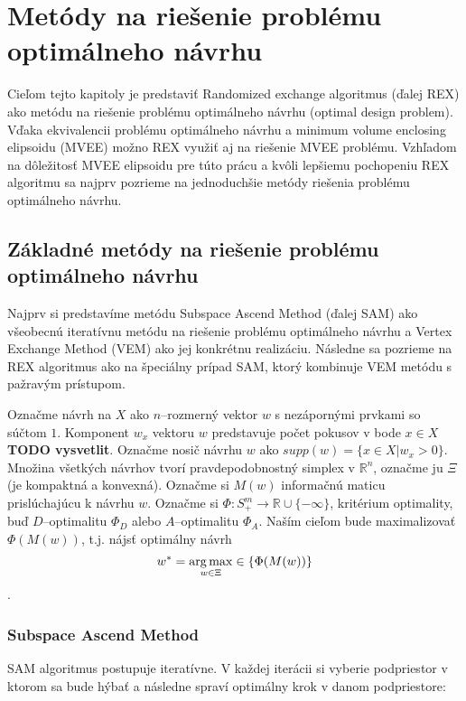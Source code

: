 \chapter{Metódy na riešenie problému optimálneho návrhu}

Cieľom tejto kapitoly je predstaviť Randomized exchange algoritmus \cite{rex_harman} (ďalej REX) ako metódu na riešenie problému optimálneho návrhu (optimal design problem). Vďaka ekvivalencii problému optimálneho návrhu a minimum volume enclosing elipsoidu (MVEE) \cite{rex_harman} možno REX využiť aj na riešenie MVEE problému.
Vzhľadom na dôležitosť MVEE elipsoidu pre túto prácu a kvôli lepšiemu pochopeniu REX algoritmu sa najprv pozrieme na jednoduchšie metódy riešenia problému optimálneho návrhu.

\section{Základné metódy na riešenie problému optimálneho návrhu}

Najprv si predstavíme metódu Subspace Ascend Method (ďalej SAM) ako všeobecnú iteratívnu metódu na riešenie problému optimálneho návrhu a Vertex Exchange Method (VEM) ako jej konkrétnu realizáciu. Následne sa pozrieme na REX algoritmus ako na špeciálny prípad SAM, ktorý kombinuje VEM metódu s pažravým prístupom.

Označme návrh na $X$ ako $n$--rozmerný vektor $w$ s nezápornými prvkami so súčtom $1$. Komponent $w_x$ vektoru $w$ predstavuje počet pokusov v bode $x \in X$ \textbf{TODO vysvetlit}. Označme nosič návrhu $w$ ako $supp(w)=\{x \in X| w_x>0\}$. Množina všetkých návrhov tvorí pravdepodobnostný simplex v $\mathbb{R}^n$, označme ju $\Xi$ (je kompaktná a konvexná). Označme si $M(w)$ informačnú maticu prislúchajúcu k návrhu $w$. Označme si $\Phi: S^m_+ \rightarrow \mathbb{R} \cup \{-\infty\}$, kritérium optimality, buď $D$--optimalitu $\Phi_D$ alebo $A$--optimalitu $\Phi_A$. Naším cieľom bude maximalizovať $\Phi(M(w))$, t.j. nájsť optimálny návrh $$w^* = \operatorname*{arg\,max}_{w \in \Xi} \in \{\Phi(M(w))\}$$.

\subsection{Subspace Ascend Method}

SAM algoritmus postupuje iteratívne. V každej iterácii si vyberie podpriestor v ktorom sa bude hýbať a následne spraví optimálny krok v danom podpriestore:


